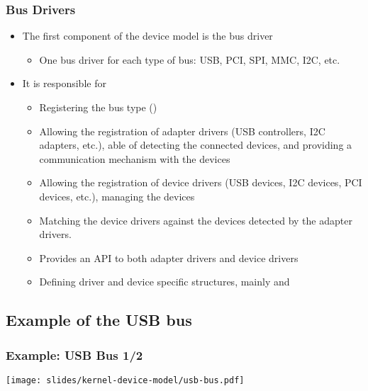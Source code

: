 \begin{frame}
  \frametitle{Bus Drivers}
  \begin{itemize}
  \item The first component of the device model is the bus driver
    \begin{itemize}
    \item One bus driver for each type of bus: USB, PCI, SPI, MMC,
      I2C, etc.
    \end{itemize}
  \item It is responsible for
    \begin{itemize}
    \item Registering the bus type ()
    \item Allowing the registration of adapter drivers (USB
      controllers, I2C adapters, etc.), able of detecting the
      connected devices, and providing a communication mechanism with
      the devices
    \item Allowing the registration of device drivers (USB devices,
      I2C devices, PCI devices, etc.), managing the devices
    \item Matching the device drivers against the devices detected by
      the adapter drivers.
    \item Provides an API to both adapter drivers and device drivers
    \item Defining driver and device specific structures, mainly
       and 
    \end{itemize}
  \end{itemize}
\end{frame}

\subsection{Example of the USB bus}

\begin{frame}
\frametitle{Example: USB Bus 1/2}
  \begin{center}
    \texttt{[image: slides/kernel-device-model/usb-bus.pdf]}
  \end{center}
\end{frame}

